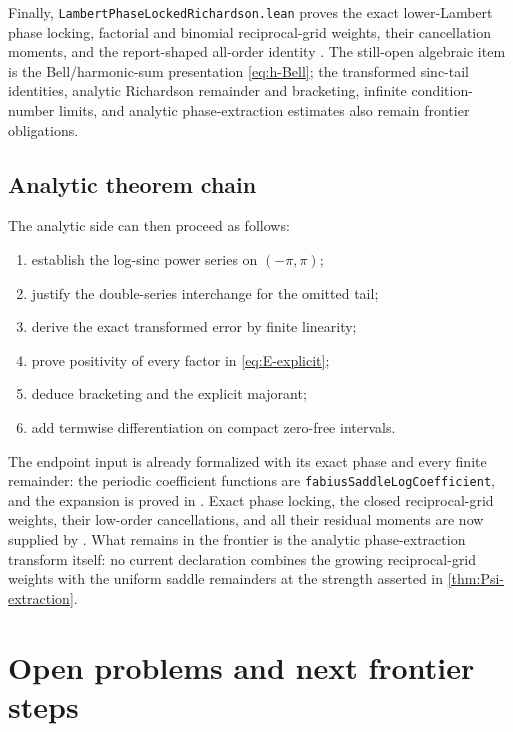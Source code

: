 \documentclass[11pt]{article}
\theoremstyle{definition}
\theoremstyle{remark}
\begin{document}
Finally, \texttt{LambertPhaseLockedRichardson.lean} proves the exact
lower-Lambert phase locking, factorial and binomial reciprocal-grid weights,
their cancellation moments, and the report-shaped all-order identity
.
The still-open algebraic item is the Bell/harmonic-sum presentation
\eqref{eq:h-Bell}; the transformed sinc-tail identities, analytic Richardson
remainder and bracketing, infinite condition-number limits, and analytic
phase-extraction estimates also remain frontier obligations.

\subsection{Analytic theorem chain}

The analytic side can then proceed as follows:
\begin{enumerate}
\item establish the log-sinc power series on $(-\pi,\pi)$;
\item justify the double-series interchange for the omitted tail;
\item derive the exact transformed error by finite linearity;
\item prove positivity of every factor in \cref{eq:E-explicit};
\item deduce bracketing and the explicit majorant;
\item add termwise differentiation on compact zero-free intervals.
\end{enumerate}

The endpoint input is already formalized with its exact phase and every finite
remainder: the periodic coefficient functions are
\texttt{fabiusSaddleLogCoefficient}, and the expansion is proved in
.  Exact phase locking, the closed
reciprocal-grid weights, their low-order cancellations, and all their residual
moments are now supplied by
.  What remains in the frontier is the
analytic phase-extraction transform itself: no current declaration combines
the growing reciprocal-grid weights with the uniform saddle remainders at the
strength asserted in \cref{thm:Psi-extraction}.

\section{Open problems and next frontier steps}
\label{sec:open}
\end{document}
